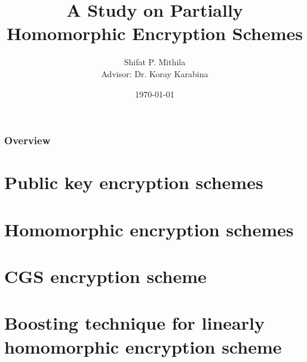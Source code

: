 \documentclass{beamer}
\title[Partially HE schemes]{A Study on Partially Homomorphic Encryption Schemes} %
\author[Shifat P. Mithila]{Shifat P. Mithila\\ Advisor: Dr. Koray Karabina} %
\institute[FAU] %
{
Florida Atlantic University \\ %
\medskip
\textit{smithila2014@fau.com} %
}
\date{\today} %
\begin{document}
\begin{frame}
\titlepage %
\end{frame}

\begin{frame}
\frametitle{Overview} %
\tableofcontents %
\end{frame}


\section{Public key encryption schemes} %



\section{Homomorphic encryption schemes}
\section{CGS encryption scheme}
\section{Boosting technique for linearly homomorphic encryption scheme}
\end{document}
